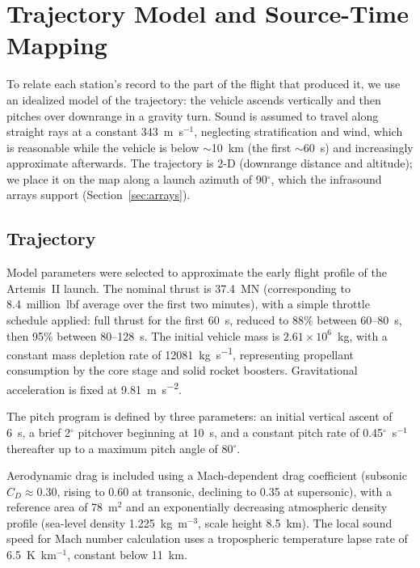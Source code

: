 \documentclass[]{seismica}
\begin{document}
\section{Trajectory Model and Source-Time Mapping}
\label{sec:trajectory}

To relate each station's record to the part of the flight that produced
it, we use an idealized model of the trajectory: the vehicle ascends
vertically and then pitches over downrange in a gravity turn. Sound is
assumed to travel along straight rays at a constant 343~m~s$^{-1}$,
neglecting stratification and wind, which is reasonable while the
vehicle is below $\sim$10~km (the first $\sim$60~s) and increasingly
approximate afterwards. The trajectory is 2-D (downrange distance and
altitude); we place it on the map along a launch azimuth of
90$^{\circ}$, which the infrasound arrays support
(Section~\ref{sec:arrays}).

\subsection{Trajectory}

Model parameters were selected to approximate the early flight profile
of the Artemis~II launch. The nominal thrust is 37.4~MN (corresponding
to 8.4~million~lbf average over the first two minutes), with a simple
throttle schedule applied: full thrust for the first 60~s, reduced to
88\% between 60--80~s, then 95\% between 80--128~s. The initial vehicle
mass is $2.61\times10^{6}$~kg, with a constant mass depletion rate of
\SI{12081}{\kilo\gram\per\second}, representing propellant consumption
by the core stage and solid rocket boosters. Gravitational acceleration
is fixed at \SI{9.81}{\metre\per\second\squared}.

The pitch program is defined by three parameters: an initial vertical
ascent of 6~s, a brief 2$^{\circ}$ pitchover beginning at 10~s, and a
constant pitch rate of 0.45$^{\circ}$~s$^{-1}$ thereafter up to a
maximum pitch angle of 80$^{\circ}$.

Aerodynamic drag is included using a Mach-dependent drag coefficient
(subsonic $C_D \approx 0.30$, rising to 0.60 at transonic, declining to
0.35 at supersonic), with a reference area of 78~m$^2$ and an
exponentially decreasing atmospheric density profile (sea-level density
1.225~kg~m$^{-3}$, scale height 8.5~km). The local sound speed for
Mach number calculation uses a tropospheric temperature lapse rate of
6.5~K~km$^{-1}$, constant below 11~km.
\end{document}
